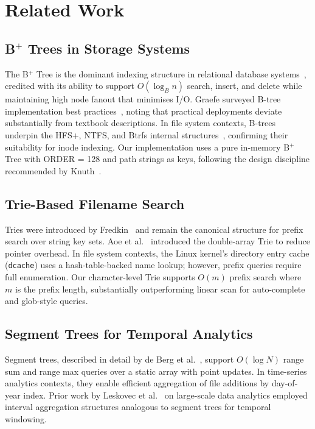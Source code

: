 \documentclass[conference]{IEEEtran}
\begin{document}
\section{Related Work}
\label{sec:related}

\subsection{B$^+$ Trees in Storage Systems}

The B$^+$ Tree is the dominant indexing structure in relational database systems~\cite{comer1979ubiquitous}, credited with its ability to support $O(\log_B n)$ search, insert, and delete while maintaining high node fanout that minimises I/O. Graefe surveyed B-tree implementation best practices~\cite{graefe2011modern}, noting that practical deployments deviate substantially from textbook descriptions. In file system contexts, B-trees underpin the HFS+, NTFS, and Btrfs internal structures~\cite{rodeh2013btrfs}, confirming their suitability for inode indexing. Our implementation uses a pure in-memory B$^+$ Tree with ORDER = 128 and path strings as keys, following the design discipline recommended by Knuth~\cite{knuth1998art}.

\subsection{Trie-Based Filename Search}

Tries were introduced by Fredkin~\cite{fredkin1960trie} and remain the canonical structure for prefix search over string key sets. Aoe et al.~\cite{aoe1989efficient} introduced the double-array Trie to reduce pointer overhead. In file system contexts, the Linux kernel's directory entry cache (\texttt{dcache}) uses a hash-table-backed name lookup; however, prefix queries require full enumeration. Our character-level Trie supports $O(m)$ prefix search where $m$ is the prefix length, substantially outperforming linear scan for auto-complete and glob-style queries.

\subsection{Segment Trees for Temporal Analytics}

Segment trees, described in detail by de Berg et al.~\cite{deberg2008computational}, support $O(\log N)$ range sum and range max queries over a static array with point updates. In time-series analytics contexts, they enable efficient aggregation of file additions by day-of-year index. Prior work by Leskovec et al.~\cite{leskovec2014mining} on large-scale data analytics employed interval aggregation structures analogous to segment trees for temporal windowing.
\end{document}
